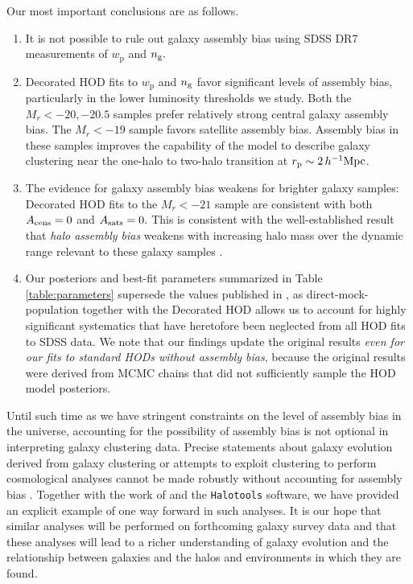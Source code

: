 \documentclass[usenatbib,usegraphicx,letterpaper]{mn2e}
\newcommand{\wprp}{w_{\mathrm{p}}}
\newcommand{\magr}{M_r}
\newcommand{\ben}{\begin{enumerate}}
\newcommand{\een}{\end{enumerate}}
\begin{document}
Our most important conclusions are as follows.
%
\ben
%
\item It is not possible to rule out galaxy assembly bias using SDSS DR7 measurements of $\wprp$ and $n_{\rm g}.$
%
\item Decorated HOD fits to $\wprp$ and $n_{\rm g}$ favor significant levels of assembly bias, particularly in the lower luminosity thresholds we study. Both the $\magr<-20, -20.5$ samples prefer relatively strong central galaxy assembly bias. The $\magr<-19$ sample favors satellite assembly bias. Assembly bias in these samples improves the capability of the model to describe galaxy clustering near
the one-halo to two-halo transition at $r_{\rm p} \sim 2 \, h^{-1}\mathrm{Mpc}$.
%
\item The evidence for galaxy assembly bias weakens for brighter galaxy samples: Decorated HOD fits to the $\magr<-21$ sample are consistent with both $A_{\rm cens}=0$ and $A_{\rm sats}=0.$ This is consistent with the well-established result that
{\em halo assembly bias} weakens with increasing halo mass over the dynamic range relevant to these galaxy samples
\citep[see, e.g., Figure 8 of][and references therein]{hearin_etal16}.
%
\item Our posteriors and best-fit parameters summarized in
Table \ref{table:parameters} supersede the values published in \citet{zehavi_etal11},
as direct-mock-population together with the Decorated HOD allows us to account for
highly significant systematics that have heretofore been neglected from all HOD fits to SDSS data.
We note that our findings update the original \citet{zehavi_etal11} results
{\em even for our fits to standard HODs without assembly bias}, because
the original results were derived from MCMC chains that did not sufficiently sample the HOD model posteriors.
%
\een
%

Until such time as we have stringent constraints on the level of assembly bias in the 
universe, accounting for the possibility of assembly bias is not optional in interpreting 
galaxy clustering data. Precise statements about galaxy evolution derived from 
galaxy clustering or attempts to exploit clustering to perform cosmological analyses 
cannot be made robustly without accounting for assembly bias \citep[see][]{zentner_etal14}. 
Together with the work of \citet{hearin_etal16} and the {\tt Halotools} software, we have provided 
an explicit example of one way forward in such analyses. It is our hope that similar analyses 
will be performed on forthcoming galaxy survey data and that these analyses will lead to a
richer understanding of galaxy evolution and the relationship between galaxies and the halos 
and environments in which they are found.
\end{document}
